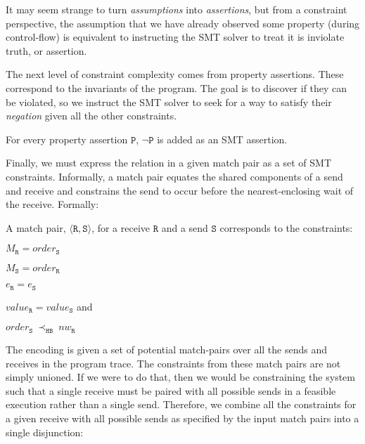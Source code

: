 It may seem strange to turn \emph{assumptions} into
\emph{assertions}, but from a constraint perspective, the assumption
that we have already observed some property (during control-flow) is
equivalent to instructing the SMT solver to treat it is inviolate
truth, or assertion.

The next level of constraint complexity comes from property
assertions. These correspond to the invariants of the program. The
goal is to discover if they can be violated, so we instruct the SMT
solver to seek for a way to satisfy their \emph{negation} given all
the other constraints.

\begin{definition} \label{def:assert}
For every property assertion $\mathtt{P}$, $\neg \mathtt{P}$ is added as
an SMT assertion.
\end{definition}

Finally, we must express the relation in a given match pair as a set of SMT
constraints. Informally, a match pair equates the shared components of
a send and receive and constrains the send to occur before the
nearest-enclosing wait of the receive. Formally:

\begin{definition} \label{def:match}
A match pair, $\langle\mathtt{R}, \mathtt{S}\rangle$, for a receive
$\mathtt{R}$ and a send $\mathtt{S}$ corresponds to the constraints:
\begin{compactenum}
\item $M_{\mathtt{R}} = \mathit{order}_{\mathtt{S}}$
\item $M_{\mathtt{S}} = \mathit{order}_{\mathtt{R}}$
\item $e_{\mathtt{R}} = e_{\mathtt{S}}$
\item $\mathit{value}_{\mathtt{R}} = \mathit{value}_{\mathtt{S}}$ and
\item $\mathit{order}_{\mathtt{S}}\ \mathrm{\prec_\mathtt{HB}}\ \mathit{nw}_{\mathtt{R}}$
\end{compactenum}
\end{definition}

The encoding is given a set of potential match-pairs over all the
sends and receives in the program trace. The constraints from these
match pairs are not simply unioned. If we were to do that, then we
would be constraining the system such that a single receive must be
paired with all possible sends in a feasible execution rather than a
single send. Therefore, we combine all the constraints for a given
receive with all possible sends as specified by the input match pairs
into a single disjunction:

